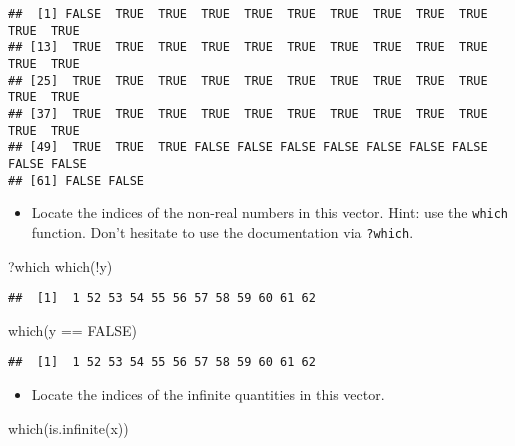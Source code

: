 \documentclass[
]{article}
\newenvironment{Shaded}{\begin{snugshade}}{\end{snugshade}}
\newcommand{\ConstantTok}[1]{\textcolor[rgb]{0.00,0.00,0.00}{#1}}
\newcommand{\FunctionTok}[1]{\textcolor[rgb]{0.00,0.00,0.00}{#1}}
\newcommand{\NormalTok}[1]{#1}
\newcommand{\SpecialCharTok}[1]{\textcolor[rgb]{0.00,0.00,0.00}{#1}}
\providecommand{\tightlist}{%
  \setlength{\itemsep}{0pt}\setlength{\parskip}{0pt}}
\begin{document}
\begin{verbatim}
##  [1] FALSE  TRUE  TRUE  TRUE  TRUE  TRUE  TRUE  TRUE  TRUE  TRUE  TRUE  TRUE
## [13]  TRUE  TRUE  TRUE  TRUE  TRUE  TRUE  TRUE  TRUE  TRUE  TRUE  TRUE  TRUE
## [25]  TRUE  TRUE  TRUE  TRUE  TRUE  TRUE  TRUE  TRUE  TRUE  TRUE  TRUE  TRUE
## [37]  TRUE  TRUE  TRUE  TRUE  TRUE  TRUE  TRUE  TRUE  TRUE  TRUE  TRUE  TRUE
## [49]  TRUE  TRUE  TRUE FALSE FALSE FALSE FALSE FALSE FALSE FALSE FALSE FALSE
## [61] FALSE FALSE
\end{verbatim}

\begin{itemize}
\tightlist
\item
  Locate the indices of the non-real numbers in this vector. Hint: use
  the \texttt{which} function. Don't hesitate to use the documentation
  via \texttt{?which}.
\end{itemize}

\begin{Shaded}
\begin{Highlighting}[]
\NormalTok{?which}
\FunctionTok{which}\NormalTok{(}\SpecialCharTok{!}\NormalTok{y)}
\end{Highlighting}
\end{Shaded}

\begin{verbatim}
##  [1]  1 52 53 54 55 56 57 58 59 60 61 62
\end{verbatim}

\begin{Shaded}
\begin{Highlighting}[]
\FunctionTok{which}\NormalTok{(y }\SpecialCharTok{==} \ConstantTok{FALSE}\NormalTok{)}
\end{Highlighting}
\end{Shaded}

\begin{verbatim}
##  [1]  1 52 53 54 55 56 57 58 59 60 61 62
\end{verbatim}

\begin{itemize}
\tightlist
\item
  Locate the indices of the infinite quantities in this vector.
\end{itemize}

\begin{Shaded}
\begin{Highlighting}[]
\FunctionTok{which}\NormalTok{(}\FunctionTok{is.infinite}\NormalTok{(x))}
\end{Highlighting}
\end{Shaded}
\end{document}
